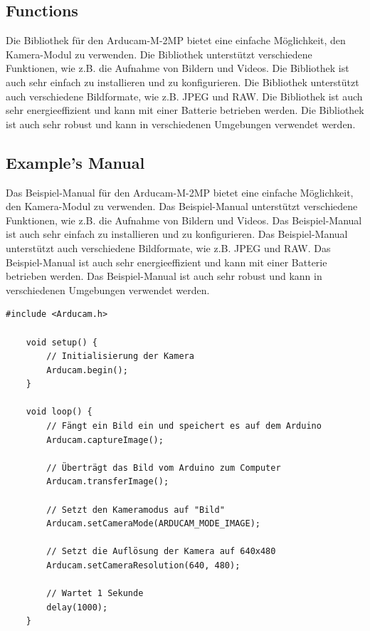 \subsection{Functions}



Die Bibliothek für den Arducam-M-2MP bietet eine einfache Möglichkeit, den Kamera-Modul zu verwenden. Die Bibliothek unterstützt verschiedene Funktionen, wie z.B. die Aufnahme von Bildern und Videos. Die Bibliothek ist auch sehr einfach zu installieren und zu konfigurieren. Die Bibliothek unterstützt auch verschiedene Bildformate, wie z.B. JPEG und RAW. Die Bibliothek ist auch sehr energieeffizient und kann mit einer Batterie betrieben werden. Die Bibliothek ist auch sehr robust und kann in verschiedenen Umgebungen verwendet werden.

\subsection{Example's Manual}

Das Beispiel-Manual für den Arducam-M-2MP bietet eine einfache Möglichkeit, den Kamera-Modul zu verwenden. Das Beispiel-Manual unterstützt verschiedene Funktionen, wie z.B. die Aufnahme von Bildern und Videos. Das Beispiel-Manual ist auch sehr einfach zu installieren und zu konfigurieren. Das Beispiel-Manual unterstützt auch verschiedene Bildformate, wie z.B. JPEG und RAW. Das Beispiel-Manual ist auch sehr energieeffizient und kann mit einer Batterie betrieben werden. Das Beispiel-Manual ist auch sehr robust und kann in verschiedenen Umgebungen verwendet werden.


\begin{lstlisting}[language=Arduino]
    #include <Arducam.h>
    
    void setup() {
        // Initialisierung der Kamera
        Arducam.begin();
    }
    
    void loop() {
        // Fängt ein Bild ein und speichert es auf dem Arduino
        Arducam.captureImage();
        
        // Überträgt das Bild vom Arduino zum Computer
        Arducam.transferImage();
        
        // Setzt den Kameramodus auf "Bild"
        Arducam.setCameraMode(ARDUCAM_MODE_IMAGE);
        
        // Setzt die Auflösung der Kamera auf 640x480
        Arducam.setCameraResolution(640, 480);
        
        // Wartet 1 Sekunde
        delay(1000);
    }
\end{lstlisting}
